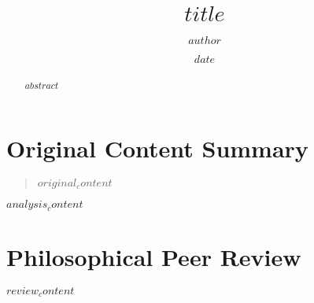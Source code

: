 \documentclass[12pt]{article}
\title{$title$}
\author{$author$}
\date{$date$}
\begin{document}
\maketitle

\begin{abstract}
$abstract$
\end{abstract}

\section{Original Content Summary}
\begin{quote}
$original_content$
\end{quote}

$analysis_content$

\section{Philosophical Peer Review}
$review_content$



\end{document}
